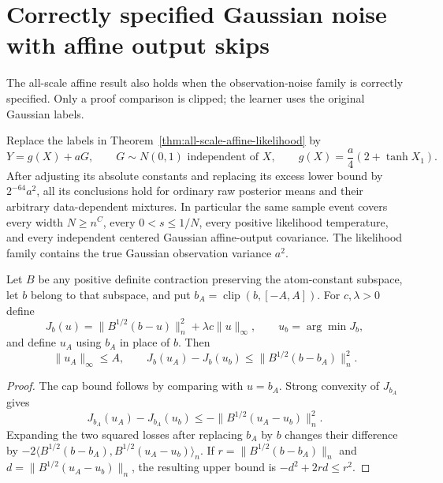 \section{Correctly specified Gaussian noise with affine output skips}
\label{sec:all-scale-gaussian-affine}
The all-scale affine result also holds when the observation-noise family is correctly specified. Only a proof comparison is clipped; the learner uses the original Gaussian labels.

\begin{corollary}
\label{cor:all-scale-gaussian-affine}
Replace the labels in Theorem~\ref{thm:all-scale-affine-likelihood} by
\[
 Y=g(X)+aG,\qquad G\sim N(0,1)\text{ independent of }X,
 \qquad g(X)=\frac a4(2+\tanh X_1).
\]
After adjusting its absolute constants and replacing its excess lower bound by $2^{-64}a^2$, all its conclusions hold for ordinary raw posterior means and their arbitrary data-dependent mixtures. In particular the same sample event covers every width $N\ge n^C$, every $0<s\le1/N$, every positive likelihood temperature, and every independent centered Gaussian affine-output covariance. The likelihood family contains the true Gaussian observation variance $a^2$.
\end{corollary}

\begin{lemma}
\label{lem:clipped-affine-prox-comparison}
Let $B$ be any positive definite contraction preserving the atom-constant subspace, let $b$ belong to that subspace, and put $b_A=\operatorname{clip}(b,[-A,A])$. For $c,\lambda>0$ define
\[
 J_b(u)=\|B^{1/2}(b-u)\|_n^2+\lambda c\|u\|_\infty,
 \qquad u_b=\arg\min J_b,
\]
and define $u_A$ using $b_A$ in place of $b$. Then
\[
 \|u_A\|_\infty\le A,
 \qquad
 J_b(u_A)-J_b(u_b)\le\|B^{1/2}(b-b_A)\|_n^2.
\]
\end{lemma}
\begin{proof}
The cap bound follows by comparing with $u=b_A$. Strong convexity of $J_{b_A}$ gives
\[
 J_{b_A}(u_A)-J_{b_A}(u_b)
                \le-\|B^{1/2}(u_A-u_b)\|_n^2.
\]
Expanding the two squared losses after replacing $b_A$ by $b$ changes their difference by
$-2\langle B^{1/2}(b-b_A),B^{1/2}(u_A-u_b)\rangle_n$. If $r=\|B^{1/2}(b-b_A)\|_n$ and $d=\|B^{1/2}(u_A-u_b)\|_n$, the resulting upper bound is $-d^2+2rd\le r^2$.
\end{proof}

